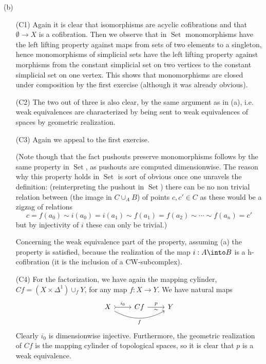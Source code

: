 \begin{exercise}[2]
(b)
\begin{enumerate}
\item[(C1)] 
Again it is clear that isomorphisms are acyclic cofibrations and that $\emptyset \to X$ is a
cofibration. Then we observe that in $\operatorname{Set}$ monomorphisms have the left lifting property against maps from sets of two elements to a singleton, hence monomorphisms of simplicial sets have the left lifting property against morphisms from the constant simplicial set on two vertices to the constant simplicial set on one vertex. This shows that monomorphisms are closed under composition by the first exercise (although it was already obvious).

\item[(C2)] 
The two out of three is also clear, by
the same argument as in (a), i.e. weak equivalences are characterized by being sent to
weak equivalences of spaces by geometric realization.

\item[(C3)]
Again we appeal to the first exercise.

(Note though that the fact pushouts preserve monomorphisms follows by the same property in $\operatorname{Set}$, as pushouts are computed dimensionwise. The reason why this property holds in $\operatorname{Set}$ is sort of obvious once one unravels the definition: (reinterpreting the pushout in $\operatorname{Set}$) there can be no non trivial relation between (the image in $C\cup_A B$) of points $c,c'\in C$ as these would be a zigzag of relations
\[c=f(a_0)\sim i(a_0)=i(a_1)\sim f(a_1)=f(a_2)\sim\cdots\sim f(a_n)=c'\]
but by injectivity of $i$ these can only be trivial.)

Concerning the weak equivalence part of the property, assuming (a) the property is satisfied, because the realization of the map $i:A\into B$ is a h-cofibration (it is the inclusion of a CW-subcomplex).

\item[(C4)]
For the factorization, we have again the mapping cylinder, 
$Cf = (X\times \Delta^1) \cup_f Y$, for any map $f: X \to Y$. We have natural maps
\[ \begin{tikzcd}
X \ar[r, tail, "i_0"] \ar[rr, bend right, "f"']
& Cf \ar[r, "p", "\sim"'] 
& Y 
\end{tikzcd} \]
Clearly $i_0$ is dimensionwise injective.
Furthermore, the geometric realization of $Cf$ is the mapping cylinder of topological spaces,
so it is clear that $p$ is a weak equivalence.
\end{enumerate}


\end{exercise}
